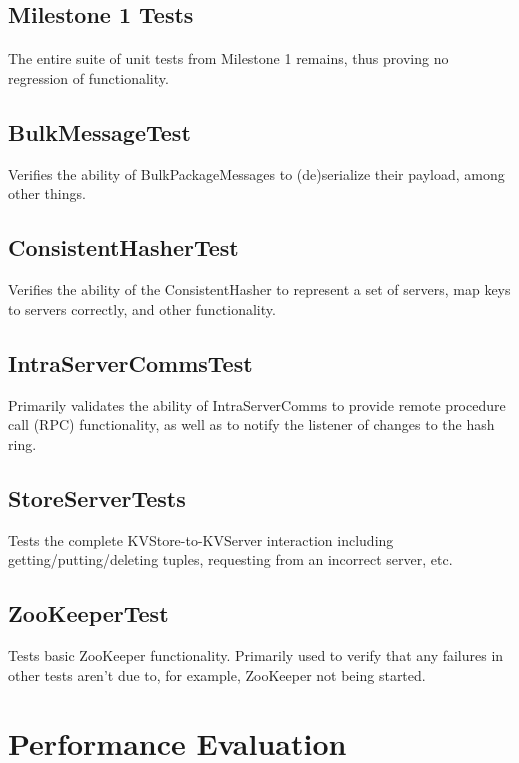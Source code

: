\documentclass[10pt]{article}
\begin{document}
\begin{multicols}{2}
\subsection{Milestone 1 Tests}

\paragraph{} The entire suite of unit tests from Milestone 1 remains, thus proving no regression of functionality.

\subsection{BulkMessageTest} Verifies the ability of BulkPackageMessages to (de)serialize their payload, among other things.

\subsection{ConsistentHasherTest} Verifies the ability of the ConsistentHasher to represent a set of servers, map keys to servers correctly, and other functionality.

\subsection{IntraServerCommsTest} Primarily validates the ability of IntraServerComms to provide remote procedure call (RPC) functionality, as well as to notify the listener of changes to the hash ring.

\subsection{StoreServerTests} Tests the complete KVStore-to-KVServer interaction including getting/putting/deleting tuples, requesting from an incorrect server, etc.

\subsection{ZooKeeperTest} Tests basic ZooKeeper functionality. Primarily used to verify that any failures in other tests aren't due to, for example, ZooKeeper not being started.

\section{Performance Evaluation}


\end{multicols}
\end{document}
